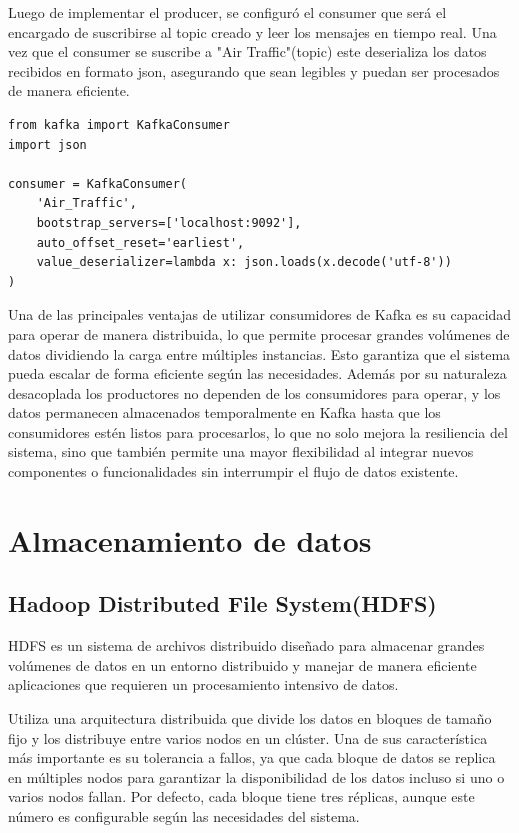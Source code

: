 \documentclass{article}
\begin{document}
Luego de implementar el producer, se configuró el consumer que será el encargado de suscribirse al topic creado y leer los mensajes en tiempo real. Una vez que el consumer se suscribe a "Air Traffic"(topic) este deserializa los datos recibidos en formato json, asegurando que sean legibles y puedan ser procesados de manera eficiente.

\begin{lstlisting}[style=python]
from kafka import KafkaConsumer
import json

consumer = KafkaConsumer(
    'Air_Traffic',
    bootstrap_servers=['localhost:9092'],
    auto_offset_reset='earliest',
    value_deserializer=lambda x: json.loads(x.decode('utf-8'))
)
\end{lstlisting}

Una de las principales ventajas de utilizar consumidores de Kafka es su capacidad para operar de manera distribuida, lo que permite procesar grandes volúmenes de datos dividiendo la carga entre múltiples instancias. Esto garantiza que el sistema pueda escalar de forma eficiente según las necesidades.
Además por su naturaleza desacoplada los productores no dependen de los consumidores para operar, y los datos permanecen almacenados temporalmente en Kafka hasta que los consumidores estén listos para procesarlos, lo que no solo mejora la resiliencia del sistema, sino que también permite una mayor flexibilidad al integrar nuevos componentes o funcionalidades sin interrumpir el flujo de datos existente.

\section{Almacenamiento de datos}

\subsection{Hadoop Distributed File System(HDFS)}

HDFS es un sistema de archivos distribuido diseñado para almacenar grandes volúmenes de datos en un entorno distribuido y manejar de manera eficiente aplicaciones que requieren un procesamiento intensivo de datos.

Utiliza una arquitectura distribuida que divide los datos en bloques de tamaño fijo y los distribuye entre varios nodos en un clúster. Una de sus característica más importante es su  tolerancia a fallos, ya que cada bloque de datos se replica en múltiples nodos para garantizar la disponibilidad de los datos incluso si uno o varios nodos fallan. Por defecto, cada bloque tiene tres réplicas, aunque este número es configurable según las necesidades del sistema.
\end{document}
